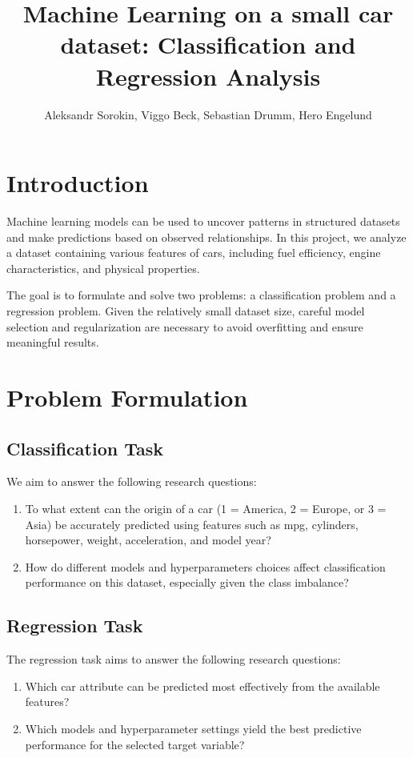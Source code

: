 \documentclass[a4paper, twocolumn]{article}
\author{Aleksandr Sorokin, Viggo Beck, Sebastian Drumm, Hero Engelund} \title{Machine Learning on a small car dataset: Classification and Regression Analysis}
\begin{document}


\section{Introduction}
Machine learning models can be used to uncover patterns in structured datasets and make predictions based on observed relationships. In this project, we analyze a dataset containing various features of cars, including fuel efficiency, engine characteristics, and physical properties.

The goal is to formulate and solve two problems: a classification problem and a regression problem. Given the relatively small dataset size, careful model selection and regularization are necessary to avoid overfitting and ensure meaningful results.
\section{Problem Formulation}
\subsection{Classification Task}
We aim to answer the following research questions:
\begin{enumerate}
    \item To what extent can the origin of a car (1 = America, 2 = Europe, or 3 = Asia) be accurately predicted using features such as mpg, cylinders, horsepower, weight, acceleration, and model year?
    \item How do different models and hyperparameters choices affect classification performance on this dataset, especially given the class imbalance?
\end{enumerate}
\subsection{Regression Task}
The regression task aims to answer the following research questions:
\begin{enumerate}
    \item Which car attribute can be predicted most effectively from the available features?
    \item Which models and hyperparameter settings yield the best predictive performance for the selected target variable?
\end{enumerate}
\end{document}
